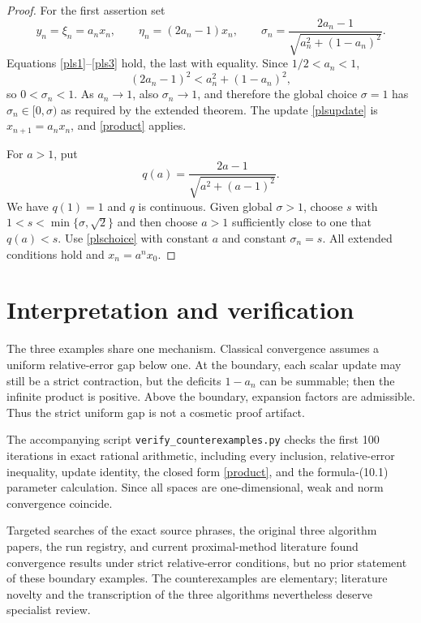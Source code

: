 \documentclass[11pt]{article}
\begin{document}
\begin{proof}
For the first assertion set
\begin{equation}\label{plschoice}
 y_n=\xi_n=a_nx_n,\qquad \eta_n=(2a_n-1)x_n,\qquad
 \sigma_n=\frac{2a_n-1}{\sqrt{a_n^2+(1-a_n)^2}}.
\end{equation}
Equations \eqref{pls1}--\eqref{pls3} hold, the last with equality.  Since
$1/2<a_n<1$,
\[
 (2a_n-1)^2<a_n^2+(1-a_n)^2,
\]
so $0<\sigma_n<1$.  As $a_n\to1$, also $\sigma_n\to1$, and therefore the
global choice $\sigma=1$ has $\sigma_n\in[0,\sigma)$ as required by the
extended theorem.  The update \eqref{plsupdate} is $x_{n+1}=a_nx_n$,
and \eqref{product} applies.

For $a>1$, put
\[
 q(a)=\frac{2a-1}{\sqrt{a^2+(a-1)^2}}.
\]
We have $q(1)=1$ and $q$ is continuous.  Given global $\sigma>1$, choose
$s$ with $1<s<\min\{\sigma,\sqrt2\}$ and then choose $a>1$ sufficiently
close to one that $q(a)<s$.  Use \eqref{plschoice} with constant $a$ and
constant $\sigma_n=s$.  All extended conditions hold and
$x_n=a^nx_0$.
\end{proof}

\section{Interpretation and verification}

The three examples share one mechanism.  Classical convergence assumes a
uniform relative-error gap below one.  At the boundary, each scalar update may
still be a strict contraction, but the deficits $1-a_n$ can be summable; then
the infinite product is positive.  Above the boundary, expansion factors are
admissible.  Thus the strict uniform gap is not a cosmetic proof artifact.

The accompanying script \texttt{verify\_counterexamples.py} checks the first
100 iterations in exact rational arithmetic, including every inclusion,
relative-error inequality, update identity, the closed form
\eqref{product}, and the formula-(10.1) parameter calculation.  Since all
spaces are one-dimensional, weak and norm convergence coincide.

Targeted searches of the exact source phrases, the original three algorithm
papers, the run registry, and current proximal-method literature found
convergence results under strict relative-error conditions, but no prior
statement of these boundary examples.  The counterexamples are elementary;
literature novelty and the transcription of the three algorithms nevertheless
deserve specialist review.
\end{document}
